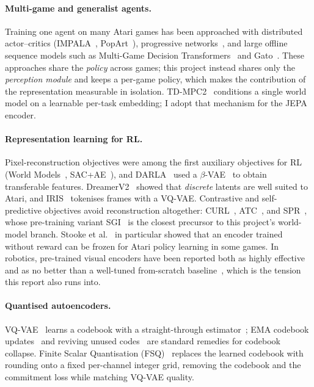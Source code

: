 \documentclass[runningheads]{llncs}
\begin{document}
\paragraph{Multi-game and generalist agents.}
Training one agent on many Atari games has been approached with distributed
actor--critics (IMPALA~\cite{espeholt2018impala}, PopArt~\cite{hessel2019popart}),
progressive networks~\cite{rusu2016progressive}, and large offline sequence models
such as Multi-Game Decision Transformers~\cite{lee2022multigame} and
Gato~\cite{reed2022gato}. These approaches share the \emph{policy} across games; this
project instead shares only the \emph{perception module} and keeps a per-game policy,
which makes the contribution of the representation measurable in isolation. TD-MPC2~\cite{hansen2024tdmpc2}
conditions a single world model on a learnable per-task embedding; I adopt that
mechanism for the JEPA encoder.

\paragraph{Representation learning for RL.}
Pixel-reconstruction objectives were among the first auxiliary objectives for RL
(World Models~\cite{ha2018worldmodels}, SAC+AE~\cite{yarats2021sac_ae}), and
DARLA~\cite{higgins2017darla} used a $\beta$-VAE~\cite{higgins2017betavae} to obtain
transferable features. DreamerV2~\cite{hafner2021dreamerv2} showed that
\emph{discrete} latents are well suited to Atari, and IRIS~\cite{micheli2023iris}
tokenises frames with a VQ-VAE. Contrastive and self-predictive objectives avoid
reconstruction altogether: CURL~\cite{laskin2020curl}, ATC~\cite{stooke2021atc}, and
SPR~\cite{schwarzer2021spr}, whose pre-training variant SGI~\cite{schwarzer2021sgi}
is the closest precursor to this project's world-model branch. Stooke et
al.~\cite{stooke2021atc} in particular showed that an encoder trained without reward
can be frozen for Atari policy learning in some games. In robotics, pre-trained
visual encoders have been reported both as highly
effective~\cite{parisi2022pvr,nair2022r3m} and as no better than a well-tuned
from-scratch baseline~\cite{hansen2022pretrained}, which is the tension this report
also runs into.

\paragraph{Quantised autoencoders.}
VQ-VAE~\cite{vandenoord2017vqvae} learns a codebook with a straight-through
estimator~\cite{bengio2013ste}; EMA codebook updates~\cite{razavi2019vqvae2} and
reviving unused codes~\cite{dhariwal2020jukebox} are standard remedies for codebook
collapse. Finite Scalar Quantisation (FSQ)~\cite{mentzer2024fsq} replaces the learned
codebook with rounding onto a fixed per-channel integer grid, removing the codebook and
the commitment loss while matching VQ-VAE quality.
\end{document}
